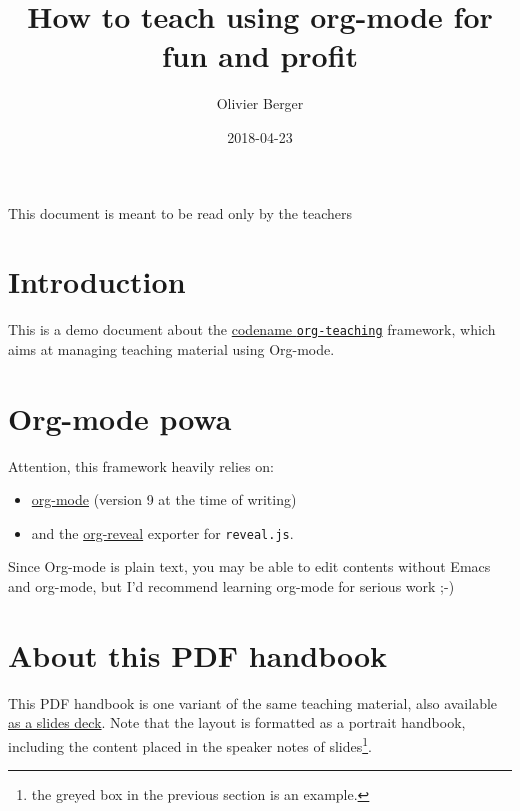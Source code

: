 \documentclass[a4paper]{article}
\author{Olivier Berger}
\date{2018-04-23}
\title{How to teach using org-mode for fun and profit}
\newenvironment{NOTES}{\begin{lrbox}{\mybox}\begin{minipage}{0.9\textwidth}\begin{shaded}}{\end{shaded}\end{minipage}\end{lrbox}\fbox{\usebox{\mybox}}}
\begin{document}
\maketitle
\setcounter{tocdepth}{2}
\tableofcontents

\begin{ABSTRACT}
\begin{shaded}
This document is meant to be read only by the teachers
\end{shaded}
\end{ABSTRACT}

\section{Introduction}
\label{sec:org30bb94c}

This is a demo document about the
\href{http://www-public.tem-tsp.eu/\~berger\_o/org-teaching/}{codename \texttt{org-teaching}} 
framework, which aims at managing teaching material using Org-mode.

\section{Org-mode powa}
\label{sec:org4d26a26}

Attention, this framework heavily relies on: 

\begin{itemize}
\item \href{http://orgmode.org/}{org-mode} (version 9 at the time of writing)
\item and the \href{https://github.com/yjwen/org-reveal/}{org-reveal} exporter for \texttt{reveal.js}.
\end{itemize}

\begin{NOTES}
Since Org-mode is plain text, you may be able to edit contents without
Emacs and org-mode, but I'd recommend learning org-mode for serious
work ;-)
\end{NOTES}

\section{About this PDF handbook}
\label{sec:org739b3dc}

This PDF handbook is one variant of the same teaching material, also
available \href{./slides.html}{as a slides deck}. Note that the layout is
formatted as a portrait handbook, including the content placed in the
speaker notes of slides\footnote{the greyed box in the previous section is an example.}.
\end{document}
